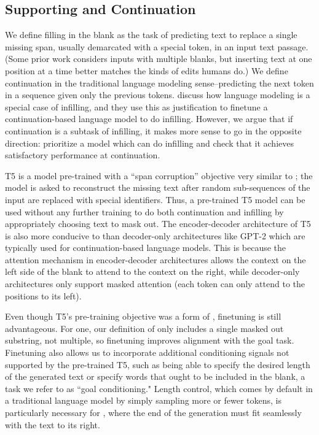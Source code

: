 \subsection{Supporting \FitB{} and Continuation}
\label{section:fitb_fite_methods}
We define filling in the blank as the task of predicting text to replace a single missing span, usually demarcated with a special token, in an input text passage. (Some prior work considers inputs with multiple blanks, but inserting text at one position at a time better matches the kinds of edits humans do.)
We define continuation in the traditional language modeling sense--predicting the next token in a sequence given only the previous tokens.
\citet{donahue2020enabling} discuss how language modeling is a special case of infilling, and they use this as justification to finetune a continuation-based language model to do infilling.
However, we argue that if continuation is a subtask of infilling, it makes more sense to go in the opposite direction: prioritize a model which can do infilling and check that it achieves satisfactory performance at continuation.

T5 is a model pre-trained with a ``span corruption'' objective very similar to \FitB; the model is asked to reconstruct the missing text after random sub-sequences of the input are replaced with special identifiers.
Thus, a pre-trained T5 model can be used without any further training to do both continuation and infilling by appropriately choosing text to mask out.
The encoder-decoder architecture of T5 is also more conducive to \FitB{} than decoder-only architectures like GPT-2 \citep{radford2019language} which are typically used for continuation-based language models.
This is because the attention mechanism in encoder-decoder architectures allows the context on the left side of the blank to attend to the context on the right, while decoder-only architectures only support masked attention (each token can only attend to the positions to its left).

Even though T5's pre-training objective was a form of \FitB, finetuning is still advantageous.
For one, our definition of \FitB{} only includes a single masked out substring, not multiple, so finetuning improves alignment with the goal task.
Finetuning also allows us to incorporate additional conditioning signals not supported by the pre-trained T5, such as being able to specify the desired length of the generated text or specify words that ought to be included in the blank, a task we refer to as ``goal conditioning."
Length control, which comes by default in a traditional language model
by simply sampling more or fewer
tokens, is particularly necessary for \FitB, where the end of the generation must fit seamlessly with the text to its right.

